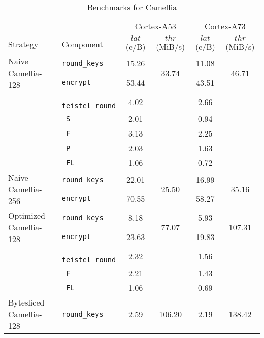 \begin{table}[!htpb]
    \centering
    \caption{Benchmarks for Camellia}
    \scriptsize
    \begin{tabular}{llcccc}
        \toprule
        & & \multicolumn{2}{c}{Cortex-A53} & \multicolumn{2}{c}{Cortex-A73} \\
        \cmidrule(lr){3-4}\cmidrule(lr){5-6}
        Strategy & Component & $lat$ (c/B) & $thr$ (MiB/s) & $lat$ (c/B) & $thr$ (MiB/s) \\
        \midrule
        \multirow{2}{*}{Naive Camellia-128} & \texttt{round\_keys} & 15.26 & \multirow{2}{*}{33.74} & 11.08 & \multirow{2}{*}{46.71} \\
                                                & \texttt{encrypt} & 53.44 & &  43.51 & \\
        \cmidrule(lr){2-2}
                                                & \texttt{ feistel\_round} & 4.02 & & 2.66 & \\
                                                & \texttt{ S} & 2.01 & & 0.94 & \\
                                                & \texttt{ F} & 3.13 & & 2.25 & \\
                                                & \texttt{ P} & 2.03 & & 1.63 & \\
                                                & \texttt{ FL} & 1.06 & & 0.72 & \\
        \midrule
        \multirow{2}{*}{Naive Camellia-256} & \texttt{round\_keys} & 22.01 & \multirow{2}{*}{25.50} & 16.99 & \multirow{2}{*}{35.16} \\
                                                 & \texttt{encrypt} & 70.55 & & 58.27 & \\
        \midrule
        \multirow{2}{*}{Optimized Camellia-128} & \texttt{round\_keys} & 8.18 & \multirow{2}{*}{77.07} & 5.93 & \multirow{2}{*}{107.31} \\
                                                & \texttt{encrypt} & 23.63 & & 19.83 & \\
        \cmidrule(lr){2-2}
                                                & \texttt{ feistel\_round} & 2.32 & & 1.56 & \\
                                                & \texttt{ F} & 2.21 & & 1.43 & \\
                                                & \texttt{ FL} & 1.06 & & 0.69 & \\
        \midrule
        \multirow{2}{*}{Bytesliced Camellia-128} & \texttt{round\_keys} & 2.59 & \multirow{2}{*}{106.20} & 2.19 & \multirow{2}{*}{138.42} \\

\end{tabular}
\end{table}

